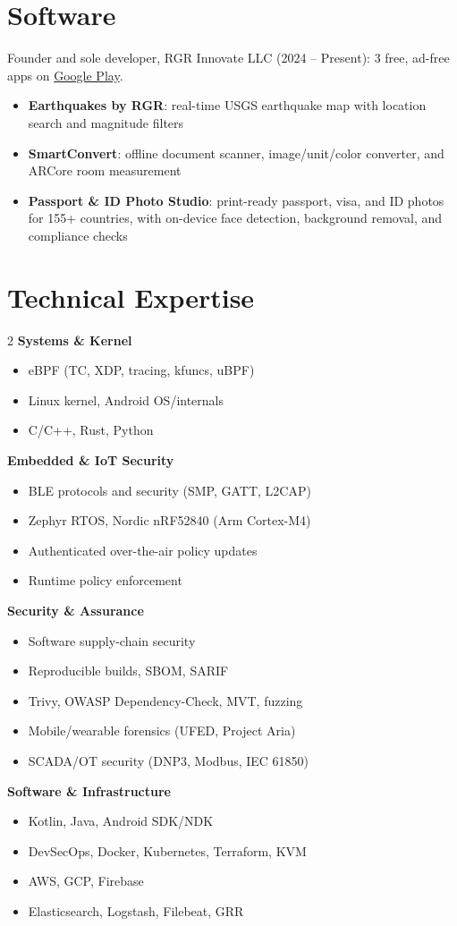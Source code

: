 \documentclass[10pt]{article}
\newcommand{\cvsection}[1]{\needspace{5\baselineskip}\section*{#1}}
\begin{document}
\cvsection{Software}
Founder and sole developer, RGR Innovate LLC (2024 -- Present): 3 free, ad-free apps on
\href{https://play.google.com/store/apps/dev?id=6755050398195804153}{Google Play}.
\begin{itemize}
 \item \textbf{Earthquakes by RGR}: real-time USGS earthquake map with location search and magnitude filters
 \item \textbf{SmartConvert}: offline document scanner, image/unit/color converter, and ARCore room measurement
 \item \textbf{Passport \& ID Photo Studio}: print-ready passport, visa, and ID photos for 155+ countries, with on-device face detection, background removal, and compliance checks
\end{itemize}

\cvsection{Technical Expertise}
\raggedcolumns
\begin{multicols}{2}
\noindent\textbf{Systems \& Kernel}
\begin{itemize}[topsep=1pt,noitemsep]
 \item eBPF (TC, XDP, tracing, kfuncs, uBPF)
 \item Linux kernel, Android OS/internals
 \item C/C++, Rust, Python
\end{itemize}

\vspace{4pt}
\noindent\textbf{Embedded \& IoT Security}
\begin{itemize}[topsep=1pt,noitemsep]
 \item BLE protocols and security (SMP, GATT, L2CAP)
 \item Zephyr RTOS, Nordic nRF52840 (Arm Cortex-M4)
 \item Authenticated over-the-air policy updates
 \item Runtime policy enforcement
\end{itemize}

\columnbreak

\noindent\textbf{Security \& Assurance}
\begin{itemize}[topsep=1pt,noitemsep]
 \item Software supply-chain security
 \item Reproducible builds, SBOM, SARIF
 \item Trivy, OWASP Dependency-Check, MVT, fuzzing
 \item Mobile/wearable forensics (UFED, Project Aria)
 \item SCADA/OT security (DNP3, Modbus, IEC 61850)
\end{itemize}

\vspace{4pt}
\noindent\textbf{Software \& Infrastructure}
\begin{itemize}[topsep=1pt,noitemsep]
 \item Kotlin, Java, Android SDK/NDK
 \item DevSecOps, Docker, Kubernetes, Terraform, KVM
 \item AWS, GCP, Firebase
 \item Elasticsearch, Logstash, Filebeat, GRR
\end{itemize}
\end{multicols}
\end{document}
